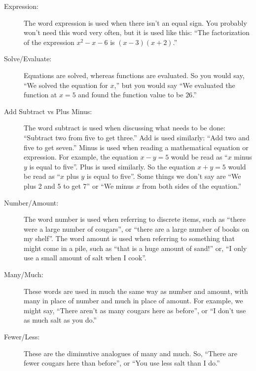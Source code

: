 \begin{description}
    \item[Expression:] The word expression is used when there isn't an equal sign. You
        probably won't need this word very often, but it is used like this: ``The
        factorization of the expression $x^2 - x - 6$ is $(x - 3)(x + 2)$.''

    \item[Solve/Evaluate:] Equations are solved, whereas functions are evaluated. So you
        would say, ``We solved the equation for $x$,'' but you would say ``We evaluated
        the function at $x = 5$ and found the function value to be $26$.''

    \item[Add Subtract vs Plus Minus:] The word subtract is used when discussing what
        needs to be done: ``Subtract two from five to get three.'' Add is used similarly:
        ``Add two and five to get seven.'' Minus is used when reading a mathematical
        equation or expression. For example, the equation $x - y = 5$ would be read as
        ``$x$ minus $y$ is equal to five''. Plus is used similarly. So the equation $x + y
        = 5$ would be read as ``$x$ plus $y$ is equal to five''. Some things we don't say
        are ``We plus 2 and 5 to get 7'' or ``We minus $x$ from both sides of the
        equation.''

    \item[Number/Amount:] The word number is used when referring to discrete items, such
        as ``there were a large number of cougars'', or ``there are a large number of
        books on my shelf''. The word amount is used when referring to something that
        might come in a pile, such as ``that is a huge amount of sand!'' or, ``I only use
        a small amount of salt when I cook''.

    \item[Many/Much:] These words are used in much the same way as number and amount, with
        many in place of number and much in place of amount.  For example, we might say,
        ``There aren't as many cougars here as before'', or ``I don't use as much salt as
        you do.''

    \item[Fewer/Less:] These are the diminutive analogues of many and much. So, ``There
        are fewer cougars here than before'', or ``You use less salt than I do.''
\end{description}






